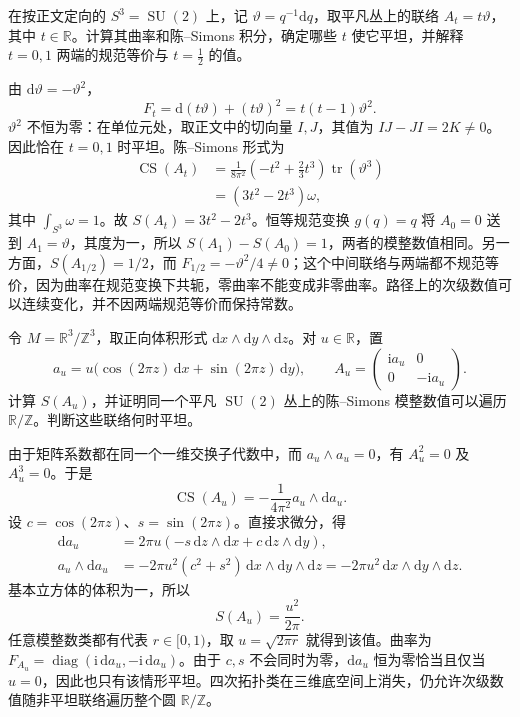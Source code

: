 \begin{exercise}\label{g2:ex:scaled-maurer-chern-simons}
	在按正文定向的 \(S^3=\operatorname{SU}(2)\) 上，记 \(\vartheta=q^{-1}\mathrm dq\)，取平凡丛上的联络 \(A_t=t\vartheta\)，其中 \(t\in\mathbb R\)。计算其曲率和陈--Simons 积分，确定哪些 \(t\) 使它平坦，并解释 \(t=0,1\) 两端的规范等价与 \(t=\tfrac12\) 的值。
\end{exercise}
\begin{solution}
	由 \(\mathrm d\vartheta=-\vartheta^2\)，
	\[
		F_t=\mathrm d(t\vartheta)+(t\vartheta)^2=t(t-1)\vartheta^2.
	\]
	\(\vartheta^2\) 不恒为零：在单位元处，取正文中的切向量 \(I,J\)，其值为 \(IJ-JI=2K\ne0\)。因此恰在 \(t=0,1\) 时平坦。陈--Simons 形式为
	\[
	\begin{aligned}
		\operatorname{CS}(A_t)
		&=\frac1{8\pi^2}\left(-t^2+\frac23t^3\right)\operatorname{tr}(\vartheta^3)\\
		&=(3t^2-2t^3)\omega,
	\end{aligned}
	\]
	其中 \(\int_{S^3}\omega=1\)。故 \(S(A_t)=3t^2-2t^3\)。恒等规范变换 \(g(q)=q\) 将 \(A_0=0\) 送到 \(A_1=\vartheta\)，其度为一，所以 \(S(A_1)-S(A_0)=1\)，两者的模整数值相同。另一方面，\(S(A_{1/2})=1/2\)，而 \(F_{1/2}=-\vartheta^2/4\ne0\)；这个中间联络与两端都不规范等价，因为曲率在规范变换下共轭，零曲率不能变成非零曲率。路径上的次级数值可以连续变化，并不因两端规范等价而保持常数。
\end{solution}

\begin{exercise}\label{g2:ex:abelian-diagonal-torus-cs}
	令 \(M=\mathbb R^3/\mathbb Z^3\)，取正向体积形式 \(\mathrm dx\wedge\mathrm dy\wedge\mathrm dz\)。对 \(u\in\mathbb R\)，置
	\[
		a_u=u\bigl(\cos(2\pi z)\,\mathrm dx+\sin(2\pi z)\,\mathrm dy\bigr),\qquad
		A_u=\begin{pmatrix}\mathrm i a_u&0\\0&-\mathrm i a_u\end{pmatrix}.
	\]
	计算 \(S(A_u)\)，并证明同一个平凡 \(\operatorname{SU}(2)\) 丛上的陈--Simons 模整数值可以遍历 \(\mathbb R/\mathbb Z\)。判断这些联络何时平坦。
\end{exercise}
\begin{solution}
	由于矩阵系数都在同一个一维交换子代数中，而 \(a_u\wedge a_u=0\)，有 \(A_u^2=0\) 及 \(A_u^3=0\)。于是
	\[
		\operatorname{CS}(A_u)=-\frac1{4\pi^2}a_u\wedge\mathrm da_u.
	\]
	设 \(c=\cos(2\pi z)\)、\(s=\sin(2\pi z)\)。直接求微分，得
	\[
	\begin{aligned}
		\mathrm da_u&=2\pi u(-s\,\mathrm dz\wedge\mathrm dx+c\,\mathrm dz\wedge\mathrm dy),\\
		a_u\wedge\mathrm da_u&=-2\pi u^2(c^2+s^2)\,\mathrm dx\wedge\mathrm dy\wedge\mathrm dz
		=-2\pi u^2\,\mathrm dx\wedge\mathrm dy\wedge\mathrm dz.
	\end{aligned}
	\]
	基本立方体的体积为一，所以
	\[
		S(A_u)=\frac{u^2}{2\pi}.
	\]
	任意模整数类都有代表 \(r\in[0,1)\)，取 \(u=\sqrt{2\pi r}\) 就得到该值。曲率为 \(F_{A_u}=\operatorname{diag}(\mathrm i\,\mathrm da_u,-\mathrm i\,\mathrm da_u)\)。由于 \(c,s\) 不会同时为零，\(\mathrm da_u\) 恒为零恰当且仅当 \(u=0\)，因此也只有该情形平坦。四次拓扑类在三维底空间上消失，仍允许次级数值随非平坦联络遍历整个圆 \(\mathbb R/\mathbb Z\)。
\end{solution}

